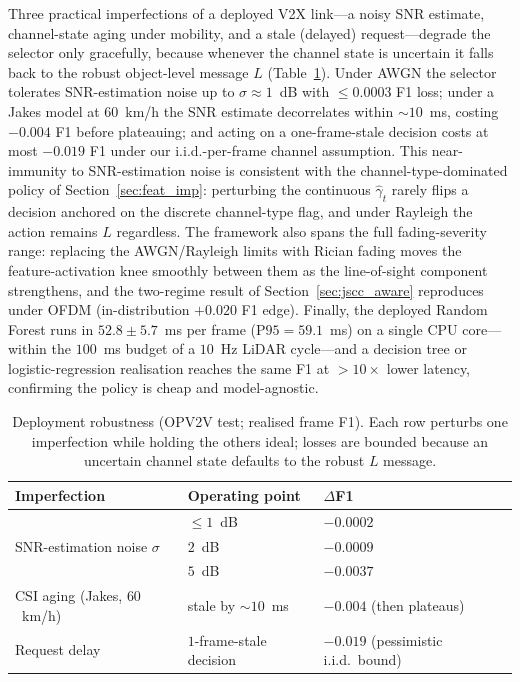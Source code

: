 \documentclass[journal]{IEEEtran}
\begin{document}
Three practical imperfections of a deployed V2X link---a noisy SNR estimate, channel-state
aging under mobility, and a stale (delayed) request---degrade the selector only gracefully,
because whenever the channel state is uncertain it falls back to the robust object-level
message $L$ (Table~\ref{tab:robustness}). Under AWGN the selector tolerates SNR-estimation
noise up to $\sigma\approx1$~dB with $\le0.0003$ F1 loss; under a Jakes model at $60$~km/h the
SNR estimate decorrelates within ${\sim}10$~ms, costing $-0.004$ F1 before plateauing; and
acting on a one-frame-stale decision costs at most $-0.019$ F1 under our i.i.d.-per-frame
channel assumption. This near-immunity to SNR-estimation noise is consistent with the channel-type-dominated policy of Section~\ref{sec:feat_imp}: perturbing the continuous $\hat\gamma_t$ rarely flips a decision anchored on the discrete channel-type flag, and under Rayleigh the action remains $L$ regardless. The framework also spans the full fading-severity range: replacing the
AWGN/Rayleigh limits with Rician fading moves the feature-activation knee smoothly between
them as the line-of-sight component strengthens, and the two-regime result of
Section~\ref{sec:jscc_aware} reproduces under OFDM (in-distribution $+0.020$ F1 edge). Finally, the deployed
Random Forest runs in $52.8\pm5.7$~ms per frame ($\mathrm{P95}=59.1$~ms) on a single CPU
core---within the $100$~ms budget of a $10$~Hz LiDAR cycle---and a decision tree or
logistic-regression realisation reaches the same F1 at $>10\times$ lower latency, confirming
the policy is cheap and model-agnostic.

\begin{table}[t]
\centering
\caption{Deployment robustness (OPV2V test; realised frame F1). Each row perturbs one
imperfection while holding the others ideal; losses are bounded because an uncertain channel
state defaults to the robust $L$ message.}
\label{tab:robustness}
\begin{tabular}{lll}
\toprule
Imperfection & Operating point & $\Delta$F1 \\
\midrule
\multirow{3}{*}{SNR-estimation noise $\sigma$}
   & $\le 1$~dB              & $-0.0002$ \\
   & $2$~dB                  & $-0.0009$ \\
   & $5$~dB                  & $-0.0037$ \\
\midrule
CSI aging (Jakes, $60$~km/h) & stale by ${\sim}10$~ms & $-0.004$ (then plateaus) \\
\midrule
Request delay & $1$-frame-stale decision & $-0.019$ (pessimistic i.i.d.\ bound) \\
\bottomrule
\end{tabular}
\end{table}
\end{document}
